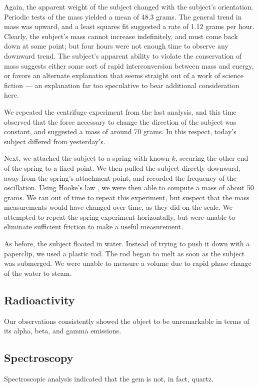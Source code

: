 \documentclass[10pt]{article}
\begin{document}
Again, the apparent weight of the subject changed with the subject's orientation.
Periodic tests of the mass yielded a mean of 48.3 grams.
The general trend in mass was upward, and a least squares fit suggested a rate of 1.12 grams per hour.
Clearly, the subject's mass cannot increase indefinitely, and must come back down at some point; but four hours were not enough time to observe any downward trend.
The subject's apparent ability to violate the conservation of mass suggests either some sort of rapid interconversion between mass and energy, or favors an alternate explanation that seems straight out of a work of science fiction --- an explanation far too speculative to bear additional consideration here.

We repeated the centrifuge experiment from the last analysis, and this time observed that the force necessary to change the direction of the subject was constant, and suggested a mass of around 70 grams.
In this respect, today's subject differed from yesterday's.

Next, we attached the subject to a spring with known $k$, securing the other end of the spring to a fixed point.
We then pulled the subject directly downward, away from the spring's attachment point, and recorded the frequency of the oscillation.
Using Hooke's law \citep{Hooke1679}, we were then able to compute a mass of about 50 grams.
We ran out of time to repeat this experiment, but suspect that the mass measurements would have changed over time, as they did on the scale.
We attempted to repeat the spring experiment horizontally, but were unable to eliminate sufficient friction to make a useful measurement.

As before, the subject floated in water.
Instead of trying to push it down with a paperclip, we used a plastic rod.
The rod began to melt as soon as the subject was submerged.
We were unable to measure a volume due to rapid phase change of the water to steam.

\subsection{Radioactivity}
Our observations consistently showed the object to be unremarkable in terms of its alpha, beta, and gamma emissions.

\subsection{Spectroscopy}
Spectroscopic analysis indicated that the gem is not, in fact, quartz.
\end{document}
